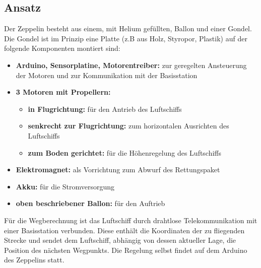 \documentclass[lang=ngerman,inputenc=utf8,fontsize=10pt]{ldvarticle}
\begin{document}
\subsection*{Ansatz}
Der Zeppelin besteht aus einem, mit Helium gefüllten, Ballon und einer Gondel. Die Gondel ist im Prinzip eine Platte (z.B aus Holz, Styropor, Plastik) auf der  folgende Komponenten montiert sind:
\begin{itemize}
	\item \textbf{Arduino, Sensorplatine, Motorentreiber:} zur geregelten Ansteuerung der Motoren und zur Kommunikation mit der Basisstation
	\item \textbf{3 Motoren mit Propellern:}
		\begin{itemize}
			\item \textbf{in Flugrichtung:} für den Antrieb des Luftschiffs
			\item \textbf{senkrecht zur Flugrichtung:} zum horizontalen Ausrichten des Luftschiffs
			\item \textbf{zum Boden gerichtet:} für die Höhenregelung des Luftschiffs
		\end{itemize}
	\item \textbf{Elektromagnet:} als Vorrichtung zum Abwurf des Rettungspaket
	\item \textbf{Akku:} für die Stromversorgung
	\item \textbf{oben beschriebener Ballon:} für den Auftrieb
\end{itemize}

Für die Wegberechnung ist das Luftschiff durch drahtlose Telekommunikation mit einer Basisstation verbunden. Diese enthält die Koordinaten der zu fliegenden Strecke und sendet dem Luftschiff, abhängig von dessen aktueller Lage, die Position des nächsten Wegpunkts. Die Regelung selbst findet auf dem Arduino des Zeppelins statt.
\end{document}
